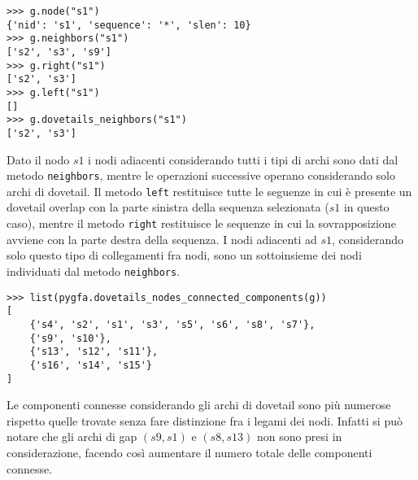 \captionsetup{justification=centering, singlelinecheck=false}
\begin{minipage}{\linewidth}
\begin{lstlisting}[basicstyle=\ttfamily\scriptsize, frame=topline]
>>> g.node("s1")
{'nid': 's1', 'sequence': '*', 'slen': 10}
>>> g.neighbors("s1")
['s2', 's3', 's9']
>>> g.right("s1")
['s2', 's3']
>>> g.left("s1")
[]
>>> g.dovetails_neighbors("s1")
['s2', 's3']
\end{lstlisting}
\end{minipage}
\captionsetup{justification=justified, singlelinecheck=false}
Dato il nodo $s1$ i nodi adiacenti considerando tutti i tipi di archi sono
dati dal metodo \texttt{neighbors}, mentre le operazioni successive
operano considerando solo archi di dovetail. Il metodo \texttt{left} restituisce
tutte le seguenze in cui è presente un dovetail overlap con la parte
sinistra della sequenza selezionata ($s1$ in questo caso), mentre il metodo
\texttt{right} restituisce le sequenze in cui la sovrapposizione avviene con
la parte destra della sequenza. I nodi adiacenti ad $s1$, considerando solo
questo tipo di collegamenti fra nodi, sono un sottoinsieme dei nodi individuati
dal metodo \texttt{neighbors}.


\captionsetup{justification=centering, singlelinecheck=false}
\begin{minipage}{\linewidth}
\begin{lstlisting}[basicstyle=\ttfamily\scriptsize, frame=topline]
>>> list(pygfa.dovetails_nodes_connected_components(g))
[
	{'s4', 's2', 's1', 's3', 's5', 's6', 's8', 's7'},
	{'s9', 's10'},
	{'s13', 's12', 's11'},
	{'s16', 's14', 's15'}
]
\end{lstlisting}
\end{minipage}
\captionsetup{justification=justified, singlelinecheck=false}
Le componenti connesse considerando gli archi di
dovetail sono più numerose rispetto quelle trovate
senza fare distinzione fra i legami dei nodi. Infatti si può
notare che gli archi di gap $(s9, s1)$ e $(s8, s13)$ non sono
presi in considerazione, facendo così aumentare il numero
totale delle componenti connesse. 


